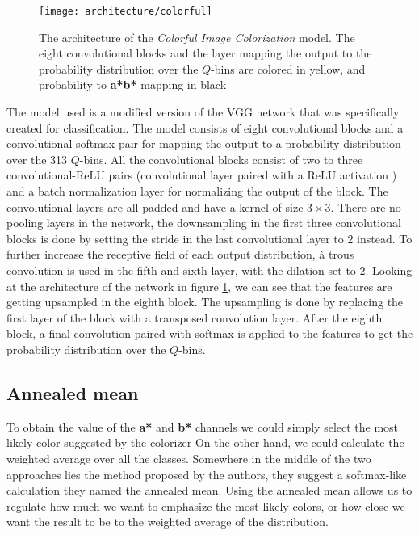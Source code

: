 \begin{figure}[!ht]
	\centering
	\texttt{[image: architecture/colorful]}
    \caption{The architecture of the \textit{Colorful Image Colorization} model. 
	The eight convolutional blocks and the layer mapping the output to the probability 
	distribution over the $Q$-bins are colored in yellow, and probability to \textbf{a*b*}
	mapping in black}
	\label{fig:architecture_colorful}
\end{figure}

The model used is a modified version of the VGG \citep{simonyan2015vgg} network 
that was specifically created for classification. The model consists of eight
convolutional blocks and a convolutional-softmax pair for mapping the output to a
probability distribution over the 313 $Q$-bins.	All the convolutional blocks
consist of two to three convolutional-ReLU pairs (convolutional layer
paired with a ReLU activation \citep{abien2018relu}) and a batch normalization layer 
\citep{ioffe2015batchnorm} for normalizing the output of the block. 
The convolutional layers are all padded and have a kernel of size $3\times3$. There are 
no pooling layers in the network, the downsampling in the first three convolutional blocks 
is done by setting the stride in the last convolutional layer to $2$ instead.
To further increase the receptive field of each output distribution, à trous convolution
\citep{yu2016atrous} is used in the fifth and sixth layer, with the dilation set to $2$. 
Looking at the architecture of the network in figure \ref{fig:architecture_colorful},
we can see that the features are getting upsampled in the eighth block. The upsampling
is done by replacing the first layer of the block with a transposed convolution layer.
After the eighth block, a final convolution paired with softmax is applied to the 
features to get the probability distribution over the $Q$-bins. 

\subsection{Annealed mean}

To obtain the value of the \textbf{a*} and \textbf{b*} channels we could 
simply select the most likely color suggested by the colorizer On 
the other hand, we could calculate the weighted average over all the classes.
Somewhere in the middle of the two approaches lies the method proposed by 
the authors, they suggest a softmax-like calculation they named the annealed mean.
Using the annealed mean allows us to regulate how much we want to emphasize the 
most likely colors, or how close we want the result to be to the weighted 
average of the distribution.

